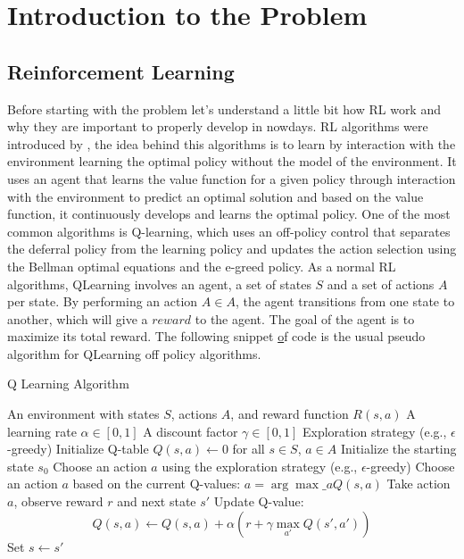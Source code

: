 
\chapter{Introduction to the Problem}
\label{cha:problem}

\section{Reinforcement Learning}

Before starting with the problem let's understand a little bit how \ac{RL} work and why they are 
important to properly develop in nowdays.
\ac{RL} algorithms were introduced by \citet{Sutton1998}, the idea behind this 
algorithms is to learn by interaction with the environment learning the optimal policy without 
the model of the environment. It uses an agent that learns the value function for a given policy 
through interaction with the environment to predict an optimal solution and based on the value 
function, it continuously develops and learns the optimal policy. One of the most common algorithms
is Q-learning\cite{8836506}, which uses an off-policy control that separates the deferral 
policy from the learning policy and updates the action selection using the Bellman optimal equations
and the e-greed policy. As a normal \ac{RL} algorithms, QLearning involves an agent, a set of states
$S$ and a set of actions $A$ per state. By performing an action $A\in A$, the agent transitions from
one state to another, which will give a $reward$ to the agent. The goal of the agent is to maximize its 
total reward. The following snippet \href{alg:qlearning} of code is the usual pseudo algorithm for 
QLearning off policy algorithms\cite{Sutton1998}.

\begin{algorithm}
\caption{Q Learning Algorithm}\label{alg:qlearning}
\begin{algorithmic}
\Require An environment with states $S$, actions $A$, and reward function $R(s, a)$
\Require A learning rate $\alpha \in [0, 1]$
\Require A discount factor $\gamma \in [0, 1]$
\Require Exploration strategy (e.g., $\epsilon$-greedy)
\State Initialize Q-table $Q(s, a) \gets 0$ for all $s \in S$, $a \in A$
    \State Initialize the starting state $s_0$
            \State Choose an action $a$ using the exploration strategy (e.g., $\epsilon$-greedy)
        \Else
            \State Choose an action $a$ based on the current Q-values: $a = \arg\max\_a Q(s, a)$
        \EndIf
        \State Take action $a$, observe reward $r$ and next state $s'$
        \State Update Q-value: 
        \[
        Q(s, a) \gets Q(s, a) + \alpha \left( r + \gamma \max_{a'} Q(s', a')\right)
        \]
        \State Set $s \gets s'$
    \EndFor
\EndFor
\end{algorithmic}
\end{algorithm}

